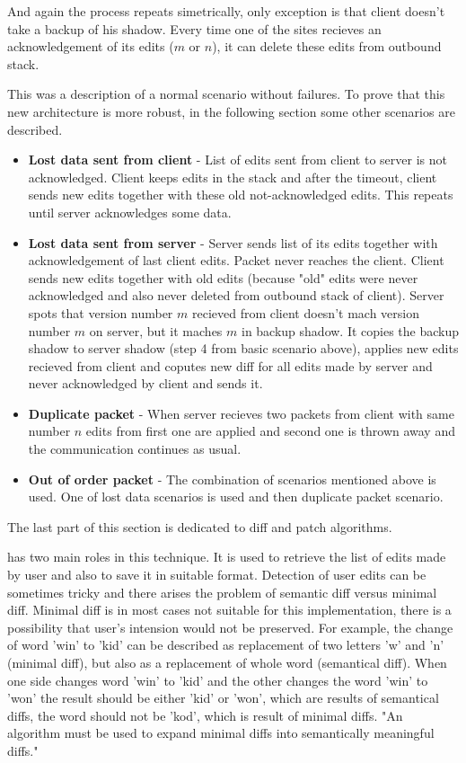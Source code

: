 \documentclass[12pt,oneside]{fithesis2}
\begin{document}
\par And again the process repeats simetrically, only exception is that client doesn't take a backup of his shadow. Every time one of the sites recieves an acknowledgement of its edits (\(m\) or \(n\)), it can delete these edits from outbound stack.
\par This was a description of a normal scenario without failures. To prove that this new architecture is more robust, in the following section some other scenarios are described.
\begin{itemize}
\item \textbf{Lost data sent from client} - List of edits sent from client to server is not acknowledged. Client keeps edits in the stack and after the timeout, client sends new edits together with these old not-acknowledged edits. This repeats until server acknowledges some data.
\item \textbf{Lost data sent from server} - Server sends list of its edits together with acknowledgement of last client edits. Packet never reaches the client. Client sends new edits together with old edits (because "old" edits were never acknowledged and also never deleted from outbound stack of client). Server spots that version number \(m\) recieved from client doesn't mach version number \(m\) on server, but it maches \(m\) in backup shadow. It copies the backup shadow to server shadow (step 4 from basic scenario above), applies new edits recieved from client and coputes new diff for all edits made by server and never acknowledged by client and sends it.
\item \textbf{Duplicate packet} - When server recieves two packets from client with same number \(n\) edits from first one are applied and second one is thrown away and the communication continues as usual.
\item \textbf{Out of order packet} - The combination of scenarios mentioned above is used. One of lost data scenarios is used and then duplicate packet scenario.\cite{Fraser} 
\end{itemize}
\par The last part of this section is dedicated to diff and patch algorithms. 
\par \underline{} has two main roles in this technique. It is used to retrieve the list of edits made by user and also to save it in suitable format. Detection of user edits can be sometimes tricky and there arises the problem of semantic diff versus minimal diff. Minimal diff is in most cases not suitable for this implementation, there is a possibility that user's intension would not be preserved. For example, the change of word 'win' to 'kid' can be described as replacement of two letters 'w' and 'n' (minimal diff), but also as a replacement of whole word (semantical diff). When one side changes word 'win' to 'kid' and the other changes the word 'win' to 'won' the result should be either 'kid' or 'won', which are results of semantical diffs, the word should not be 'kod', which is result of minimal diffs. "An algorithm must be used to expand minimal diffs into semantically meaningful diffs." \cite{Fraser}
\end{document}
